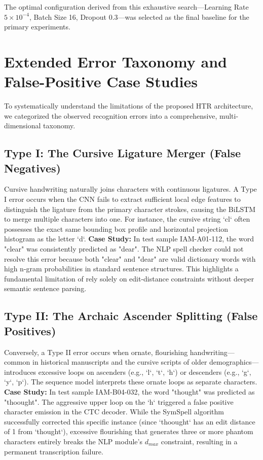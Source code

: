 The optimal configuration derived from this exhaustive search—Learning Rate $5 \times 10^{-4}$, Batch Size 16, Dropout 0.3—was selected as the final baseline for the primary experiments.

\section{Extended Error Taxonomy and False-Positive Case Studies}
To systematically understand the limitations of the proposed HTR architecture, we categorized the observed recognition errors into a comprehensive, multi-dimensional taxonomy. 

\subsection{Type I: The Cursive Ligature Merger (False Negatives)}
Cursive handwriting naturally joins characters with continuous ligatures. A Type I error occurs when the CNN fails to extract sufficient local edge features to distinguish the ligature from the primary character strokes, causing the BiLSTM to merge multiple characters into one. For instance, the cursive string `cl` often possesses the exact same bounding box profile and horizontal projection histogram as the letter `d`. 
\textbf{Case Study:} In test sample IAM-A01-112, the word "clear" was consistently predicted as "dear". The NLP spell checker could not resolve this error because both "clear" and "dear" are valid dictionary words with high n-gram probabilities in standard sentence structures. This highlights a fundamental limitation of rely solely on edit-distance constraints without deeper semantic sentence parsing.

\subsection{Type II: The Archaic Ascender Splitting (False Positives)}
Conversely, a Type II error occurs when ornate, flourishing handwriting—common in historical manuscripts and the cursive scripts of older demographics—introduces excessive loops on ascenders (e.g., `l`, `t`, `h`) or descenders (e.g., `g`, `y`, `p`). The sequence model interprets these ornate loops as separate characters. 
\textbf{Case Study:} In test sample IAM-B04-032, the word "thought" was predicted as "thoought". The aggressive upper loop on the `h` triggered a false positive character emission in the CTC decoder. While the SymSpell algorithm successfully corrected this specific instance (since `thoought` has an edit distance of 1 from `thought`), excessive flourishing that generates three or more phantom characters entirely breaks the NLP module's $d_{max}$ constraint, resulting in a permanent transcription failure.

